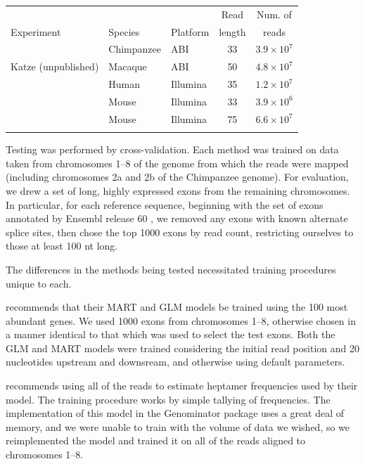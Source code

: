 \documentclass{bioinfo}
\begin{document}
\begin{table}
{
\begin{tabular}{lllcc}\toprule
 & & & Read & Num. of \\
Experiment & Species & Platform & length & reads \\\midrule
\citet{Wetterbom2010} & Chimpanzee & ABI & 33 & $3.9 \times 10^7$ \\
Katze (unpublished) & Macaque & ABI & 50  & $4.8 \times 10^7$ \\
\citet{Bullard2010} & Human & Illumina & 35 & $1.2 \times 10^7$ \\
\citet{Mortazavi2008} & Mouse & Illumina & 33 & $3.9 \times 10^6$ \\
\citet{Trapnell2010} & Mouse & Illumina & 75 & $6.6 \times 10^7$ \\\botrule
\end{tabular}
}{}
\end{table}


Testing was performed by cross-validation. Each method was trained on data taken
from chromosomes 1--8 of the genome from which the reads were mapped (including
chromosomes 2a and 2b of the Chimpanzee genome). For evaluation, we drew a set
of long, highly expressed exons from the remaining chromosomes. In particular,
for each reference sequence, beginning with the set of exons annotated by
Ensembl release 60 \cite{Hubbard2009}, we removed any exons with known alternate
splice sites, then chose the top 1000 exons by read count, restricting ourselves
to those at least 100 nt long.

The differences in the methods being tested necessitated training procedures
unique to each.

\citet{Li2010} recommends that their MART and GLM models be trained using the
100 most abundant genes. We used 1000 exons from chromosomes 1--8, otherwise
chosen in a manner identical to that which was used to select the test exons.
Both the GLM and MART models were trained considering the initial read position
and 20 nucleotides upstream and downsream, and otherwise using default
parameters.

\citet{Hansen2010} recommends using all of the reads to estimate heptamer
frequencies used by their model. The training procedure works by simple tallying
of frequencies. The implementation of this model in the Genominator package
uses a great deal of memory, and we were unable to train with the volume of
data we wished, so we reimplemented the model and trained it on all of the reads
aligned to chromosomes 1--8.
\end{document}
